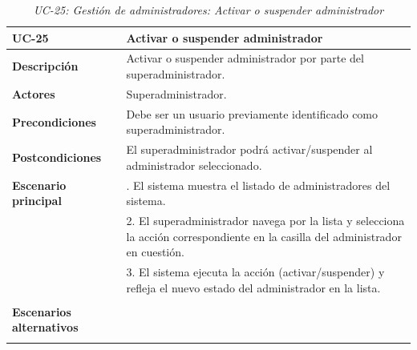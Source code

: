 \begin{table}
  \begin{center}
    \begin{tabularx}{16.4cm}{|l|X|}
      \hline
      \textbf{UC-25} & \textbf{Activar o suspender administrador}\\
      \hline
      \textbf{Descripción} & Activar o suspender administrador por parte del superadministrador. \\
      \hline
      \textbf{Actores} & Superadministrador.\\
      \hline
      \textbf{Precondiciones} & Debe ser un usuario previamente identificado como superadministrador.\\
      \hline
      \textbf{Postcondiciones} & El superadministrador podrá activar/suspender al administrador seleccionado.\\
      \hline
      \textbf{Escenario principal} & \smallskip 1. El sistema muestra el listado de administradores del sistema.\\
      & 2. El superadministrador navega por la lista y selecciona la acción correspondiente en la casilla del administrador en cuestión.\\
      & 3. El sistema ejecuta la acción (activar/suspender) y refleja el nuevo estado del administrador en la lista. \\
      & \\
      \hline
      \textbf{Escenarios alternativos} & \\
      & \\
      \hline
    \end{tabularx}
    \caption{\textit{UC-25: Gestión de administradores: Activar o suspender administrador}}
    \label{tab:CU-activar-suspender-admin}
  \end{center}
\end{table}



